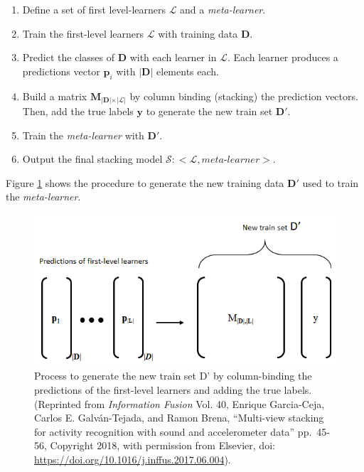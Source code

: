 \documentclass[
  11pt,
]{krantz}
\begin{document}
\begin{enumerate}
\def\labelenumi{\arabic{enumi}.}
\item
  Define a set of first level-learners \(\mathscr{L}\) and a \emph{meta-learner}.
\item
  Train the first-level learners \(\mathscr{L}\) with training data \(\textbf{D}\).
\item
  Predict the classes of \(\textbf{D}\) with each learner in \(\mathscr{L}\). Each learner produces a predictions vector \(\textbf{p}_i\) with \(\lvert\textbf{D}\lvert\) elements each.
\item
  Build a matrix \(\textbf{M}_{\lvert\textbf{D}\lvert \times \lvert\mathscr{L}\lvert}\) by column binding (stacking) the prediction vectors. Then, add the true labels \(\textbf{y}\) to generate the new train set \(\textbf{D}'\).
\item
  Train the \emph{meta-learner} with \(\textbf{D}'\).
\item
  Output the final stacking model \(\mathcal{S}:<\mathscr{L},\textit{meta-learner}>\).
\end{enumerate}

Figure \ref{fig:stackingProcess} shows the procedure to generate the new training data \(\textbf{D}'\) used to train the \emph{meta-learner}.



\begin{figure}

{\centering \includegraphics[width=0.8\linewidth]{images/stacking} 

}

\caption{Process to generate the new train set D' by column-binding the predictions of the first-level learners and adding the true labels. (Reprinted from \emph{Information Fusion} Vol. 40, Enrique Garcia-Ceja, Carlos E. Galván-Tejada, and Ramon Brena, ``Multi-view stacking for activity recognition with sound and accelerometer data'' pp.~45-56, Copyright 2018, with permission from Elsevier, doi: \url{https://doi.org/10.1016/j.inffus.2017.06.004}).}\label{fig:stackingProcess}
\end{figure}
\end{document}
